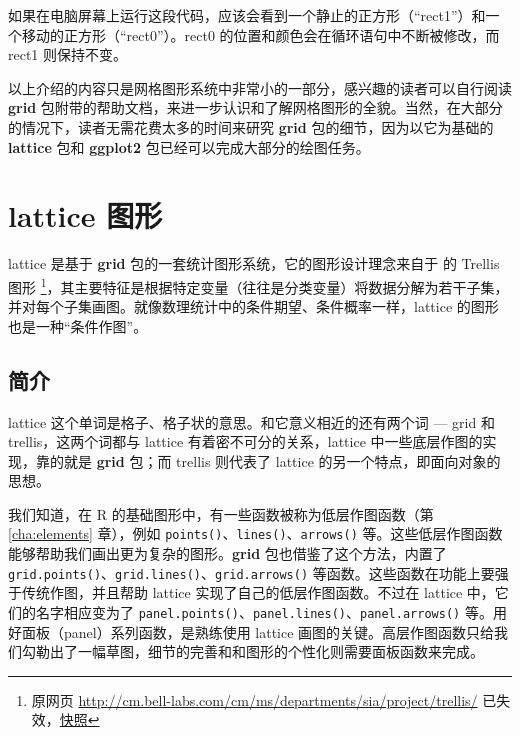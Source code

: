 \documentclass[
  b5paper,
  UTF8,twoside]{book}
\begin{document}
如果在电脑屏幕上运行这段代码，应该会看到一个静止的正方形（``rect1''）和一个移动的正方形（``rect0''）。rect0 的位置和颜色会在循环语句中不断被修改，而 rect1 则保持不变。

以上介绍的内容只是网格图形系统中非常小的一部分，感兴趣的读者可以自行阅读 \textbf{grid} 包附带的帮助文档，来进一步认识和了解网格图形的全貌。当然，在大部分的情况下，读者无需花费太多的时间来研究 \textbf{grid} 包的细节，因为以它为基础的 \textbf{lattice} 包和 \textbf{ggplot2} 包已经可以完成大部分的绘图任务。

\hypertarget{lattice-ux56feux5f62}{%
\section{lattice 图形}\label{lattice-ux56feux5f62}}

lattice \citep{Sarkar08} 是基于 \textbf{grid} 包的一套统计图形系统，它的图形设计理念来自于 \citet{Cleveland93} 的 Trellis 图形 \footnote{原网页 \url{http://cm.bell-labs.com/cm/ms/departments/sia/project/trellis/} 已失效，\href{https://web.archive.org/web/20081019072358/http://cm.bell-labs.com/cm/ms/departments/sia/project/trellis/}{快照}}，其主要特征是根据特定变量（往往是分类变量）将数据分解为若干子集，并对每个子集画图。就像数理统计中的条件期望、条件概率一样，lattice 的图形也是一种``条件作图''。

\hypertarget{subsec:lattice-intro}{%
\subsection{简介}\label{subsec:lattice-intro}}

lattice 这个单词是格子、格子状的意思。和它意义相近的还有两个词 --- grid 和 trellis，这两个词都与 lattice 有着密不可分的关系，lattice 中一些底层作图的实现，靠的就是 \textbf{grid} 包；而 trellis 则代表了 lattice 的另一个特点，即面向对象的思想。

我们知道，在 R 的基础图形中，有一些函数被称为低层作图函数（第 \ref{cha:elements} 章），例如 \texttt{points()}、\texttt{lines()}、\texttt{arrows()} 等。这些低层作图函数能够帮助我们画出更为复杂的图形。\textbf{grid} 包也借鉴了这个方法，内置了 \texttt{grid.points()}、\texttt{grid.lines()}、\texttt{grid.arrows()} 等函数。这些函数在功能上要强于传统作图，并且帮助 lattice 实现了自己的低层作图函数。不过在 lattice 中，它们的名字相应变为了 \texttt{panel.points()}、\texttt{panel.lines()}、\texttt{panel.arrows()} 等。用好面板（panel）系列函数，是熟练使用 lattice 画图的关键。高层作图函数只给我们勾勒出了一幅草图，细节的完善和和图形的个性化则需要面板函数来完成。
\end{document}
